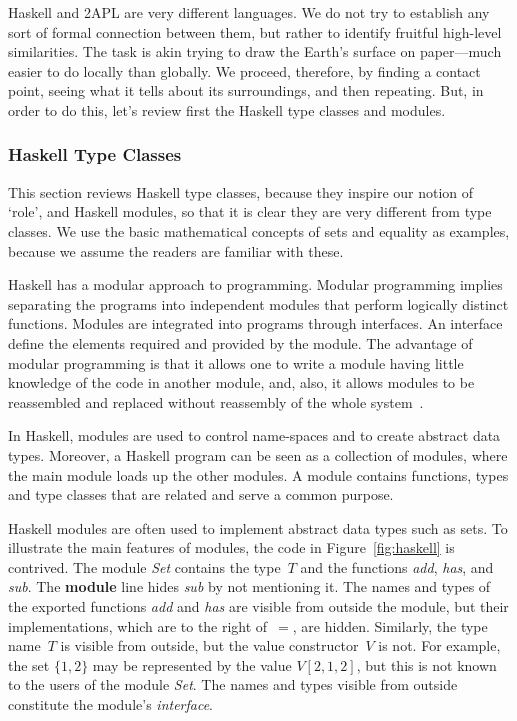 \documentclass[a4paper,12pt,oneside,fleqn]{book} %
\begin{document}
Haskell and 2APL are very different languages. We do not try to establish
any sort of formal connection between them, but rather to identify fruitful
high-level similarities. The task is akin trying to draw the Earth's
surface on paper---much easier to do locally than globally. We proceed,
therefore, by finding a contact point, seeing what it tells about its
surroundings, and then repeating. But, in order to do this, let's review
first the Haskell type classes and modules.

\subsubsection{Haskell Type Classes} %

This section reviews Haskell type classes, because they inspire our notion
of `role', and Haskell modules, so that it is clear they are very different
from type classes. We use the basic mathematical concepts of sets and
equality as examples, because we assume the readers are familiar with these.


Haskell has a modular approach to programming. Modular programming implies
separating the programs into independent modules that perform logically
distinct functions. Modules are integrated into programs through
interfaces. An interface define the elements required and provided by the
module. The advantage of modular programming is that it allows one to write
a module having little knowledge of the code in another module, and, also,
it allows modules to be reassembled and replaced without reassembly of the
whole system~\cite{DBLP:journals/cacm/Parnas72a}.

In Haskell, modules are used to control name-spaces and to create abstract
data types. Moreover, a Haskell program can be seen as a collection of
modules, where the main module loads up the other modules. A module
contains functions, types and type classes that are related and serve a
common purpose.

Haskell modules are often used to implement abstract data types such as
sets.  To illustrate the main features of modules, the code in
Figure~\ref{fig:haskell} is contrived.  The module \textit{Set} contains
the type~$T$ and the functions \textit{add}, \textit{has}, and
\textit{sub}. The \textbf{module} line hides \textit{sub} by not mentioning
it. The names and types of the exported functions \textit{add} and
\textit{has} are visible from outside the module, but their
implementations, which are to the right of~$=$, are hidden.  Similarly, the
type name~$T$ is visible from outside, but the value constructor~$V$ is
not. For example, the set $\{1,2\}$ may be represented by the value
$V[2,1,2]$, but this is not known to the users of the module \textit{Set}.
The names and types visible from outside constitute the module's
\emph{interface}.
\end{document}
